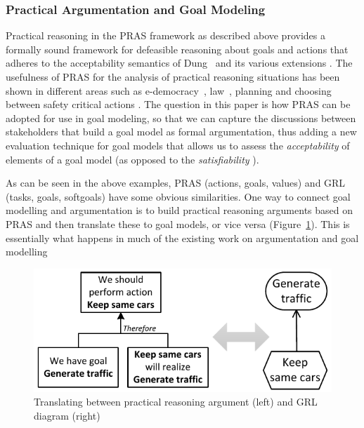 \subsubsection{Practical Argumentation and Goal Modeling}
\label{sect:background:pras:motivation}

Practical reasoning in the PRAS framework as described above provides a formally sound framework for defeasible reasoning about goals and actions that adheres to the acceptability semantics of Dung~\cite{Dung1995} and its various extensions \cite{amgoud2002reasoning,modgil2009}. The usefulness of PRAS for the analysis of practical reasoning situations has been shown in different areas such as e-democracy~\cite{cartwright2009IS}, law~\cite{atkinson2005legal}, planning \cite{medellin2013planning} and choosing between safety critical actions \cite{tolchinsky2012deliberation}. The question in this paper is how PRAS can be adopted for use in goal modeling, so that we can capture the discussions between stakeholders that build a goal model as formal argumentation, thus adding a new evaluation technique for goal models that allows us to assess the \emph{acceptability} of elements of a goal model (as opposed to the \emph{satisfiability} \cite{Amyot:2010:EGM:1841349.1841356}).

As can be seen in the above examples, PRAS (actions, goals, values) and GRL (tasks, goals, softgoals) have some obvious similarities. One way to connect goal modelling and argumentation is to build practical reasoning arguments based on PRAS and then translate these to goal models, or vice versa (Figure~\ref{fig:pras:example3}). This is essentially what happens in much of the existing work on argumentation and goal modelling \cite{Jureta:RE2008,vanzee-etal:renext2015,vanZee-etal:er2016} 

\begin{figure}[ht]
\centering
\includegraphics[width=\columnwidth]{img/Fig3}
\caption{Translating between practical reasoning argument (left) and GRL diagram (right)}
\label{fig:pras:example3}
\end{figure}  

